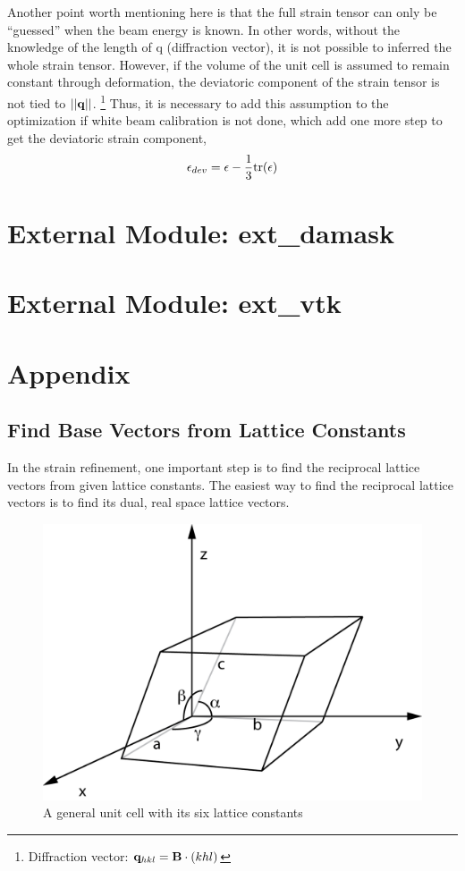 \documentclass[12pt]{scrartcl}
\begin{document}
\begin{enumerate}
Another point worth mentioning here is that the full strain tensor can only be ``guessed'' when the beam energy is known.
In other words, without the knowledge of the length of \tnsr q (diffraction vector), it is not possible to inferred the whole strain tensor.
However, if the volume of the unit cell is assumed to remain constant through deformation, the deviatoric component of the strain tensor is not tied to $||\mathbf{q}||$.
\footnote{Diffraction vector: $\mathbf{q}_{hkl} = \mathbf{B} \cdot (khl) $}
Thus, it is necessary to add this assumption to the optimization if white beam calibration is not done, which add one more step to get the deviatoric strain component,
\[
	\mathbf{\epsilon}_{dev} = \mathbf{\epsilon} - \dfrac{1}{3}\text{tr}(\mathbf{\epsilon})
\]
\end{enumerate}


\section{External Module: ext\_damask}

\section{External Module: ext\_vtk}

\section{Appendix}
\subsection{Find Base Vectors from Lattice Constants}
\label{sec:lc2bv}
In the strain refinement, one important step is to find the reciprocal lattice vectors from given lattice constants.
The easiest way to find the reciprocal lattice vectors is to find its dual, real space lattice vectors.

\begin{figure}[htp]
\centering
\includegraphics[width=.7\linewidth]{UnitCell.png}
\caption{A general unit cell with its six lattice constants}
\label{fig:unitcell}
\end{figure}
\end{document}
